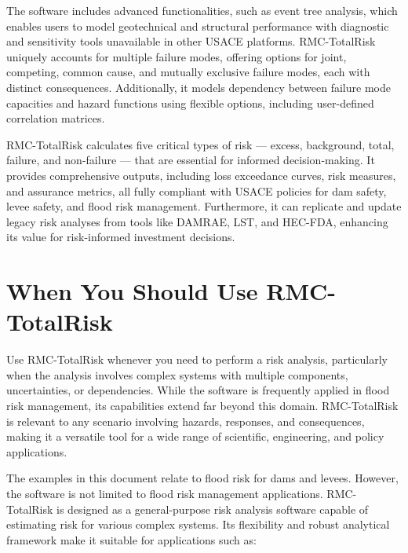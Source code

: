 \documentclass[
]{book}
\begin{document}
The software includes advanced functionalities, such as event tree analysis, which enables users to model geotechnical and structural performance with diagnostic and sensitivity tools unavailable in other USACE platforms. RMC-TotalRisk uniquely accounts for multiple failure modes, offering options for joint, competing, common cause, and mutually exclusive failure modes, each with distinct consequences. Additionally, it models dependency between failure mode capacities and hazard functions using flexible options, including user-defined correlation matrices.

RMC-TotalRisk calculates five critical types of risk --- excess, background, total, failure, and non-failure --- that are essential for informed decision-making. It provides comprehensive outputs, including loss exceedance curves, risk measures, and assurance metrics, all fully compliant with USACE policies for dam safety, levee safety, and flood risk management. Furthermore, it can replicate and update legacy risk analyses from tools like DAMRAE, LST, and HEC-FDA, enhancing its value for risk-informed investment decisions.

\hypertarget{when-you-should-use-rmc-totalrisk}{%
\section{When You Should Use RMC-TotalRisk}\label{when-you-should-use-rmc-totalrisk}}

Use RMC-TotalRisk whenever you need to perform a risk analysis, particularly when the analysis involves complex systems with multiple components, uncertainties, or dependencies. While the software is frequently applied in flood risk management, its capabilities extend far beyond this domain. RMC-TotalRisk is relevant to any scenario involving hazards, responses, and consequences, making it a versatile tool for a wide range of scientific, engineering, and policy applications.

The examples in this document relate to flood risk for dams and levees. However, the software is not limited to flood risk management applications. RMC-TotalRisk is designed as a general-purpose risk analysis software capable of estimating risk for various complex systems. Its flexibility and robust analytical framework make it suitable for applications such as:
\end{document}
